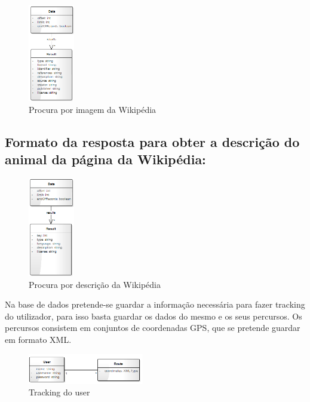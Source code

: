 \documentclass[twocolumn,twoside,11pt,a4paper]{article}
\begin{document}
\begin{figure}[ht!]
	\begin{center}
		\leavevmode
		\includegraphics[width=0.18\textwidth,height=0.18\textheight]{Search_by_key}
		\caption{Procura por imagem da Wikipédia}
		\label{fig:arch}
	\end{center}
\end{figure}

\subsection{Formato da resposta para obter a descrição do animal da página da Wikipédia:}

\begin{figure}[ht!]
	\begin{center}
		\leavevmode
		\includegraphics[width=0.18\textwidth,height=0.20\textheight]{Search_by_description}
		\caption{Procura por descrição da Wikipédia}
		\label{fig:arch}
	\end{center}
\end{figure}

Na base de dados pretende-se guardar a informação necessária para fazer tracking do utilizador, para isso basta guardar os dados do mesmo e os seus percursos. Os percursos consistem em conjuntos de coordenadas GPS, que se pretende guardar em formato XML.

\begin{figure}[ht!]
	\begin{center}
		\leavevmode
		\includegraphics[width=0.45\textwidth,height=0.09\textheight]{Tracking_db}
		\caption{Tracking do user}
		\label{fig:arch}
	\end{center}
\end{figure}
\end{document}
